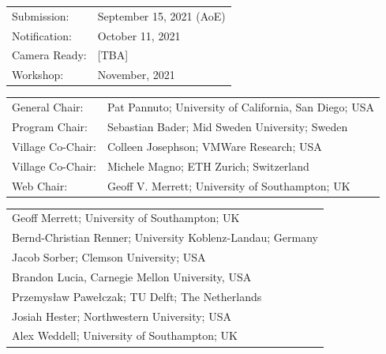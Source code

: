 \documentclass[a4paper,10pt]{scrartcl}
\begin{document}
\vskip4mm
\begin{minipage}{.49\textwidth}
\begin{tcolorbox}[boxsep=0pt, top=2mm, left=2mm, right=2mm, bottom=0mm, arc=5pt, auto outer arc, colback=cfp_lightcolor, colframe=white]
  \renewcommand{\baselinestretch}{0.95} 
  \footnotesize
  \setlength\tabcolsep{0pt}
  \begin{tabular}{p{2.0cm}l}
    Submission:   &  September 15, 2021 (AoE) \\
    Notification: &  October 11, 2021 \\
    Camera Ready: &  [TBA] \\
    Workshop:     &  November, 2021\\
  \end{tabular}
  
  \vskip1mm
  \begin{tabular}{p{2.0cm}l}
  General Chair:       & Pat Pannuto; University of California, San Diego; USA \\     %
  Program Chair:       & Sebastian Bader; Mid Sweden University; Sweden \\     %
  Village Co-Chair:    & Colleen Josephson; VMWare Research; USA \\
  Village Co-Chair:    & Michele Magno; ETH Zurich; Switzerland \\
  Web Chair:           & Geoff V. Merrett; University of Southampton; UK
  \end{tabular}

  \vskip1mm
  \begin{tabular}{l}
  Geoff Merrett; University of Southampton; UK \\
  Bernd-Christian Renner; University Koblenz-Landau; Germany \\
  Jacob Sorber; Clemson University; USA \\
  Brandon Lucia, Carnegie Mellon University, USA \\
  Przemys\textsf{\l{}}aw Pawe\textsf{\l{}}czak; TU Delft; The Netherlands \\
  Josiah Hester; Northwestern University; USA \\
  Alex Weddell; University of Southampton; UK \\
  \end{tabular}


\end{tcolorbox}
\end{minipage}
\end{document}
